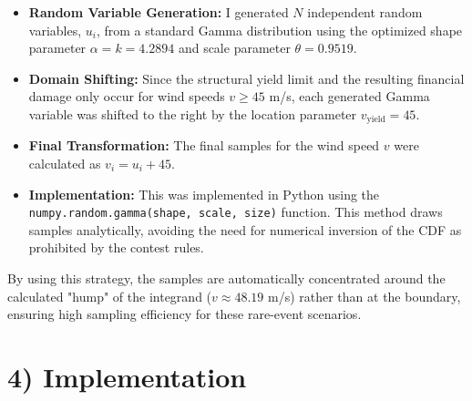\documentclass{article}
\begin{document}
\begin{itemize}
    \item \textbf{Random Variable Generation:} I generated $N$ independent random variables, $u_i$, from a standard Gamma distribution using the optimized shape parameter $\alpha = k = 4.2894$ and scale parameter $\theta = 0.9519$.
    \item \textbf{Domain Shifting:} Since the structural yield limit and the resulting financial damage only occur for wind speeds $v \geq 45$ m/s, each generated Gamma variable was shifted to the right by the location parameter $v_{\text{yield}} = 45$.
    \item \textbf{Final Transformation:} The final samples for the wind speed $v$ were calculated as $v_i = u_i + 45$.
    \item \textbf{Implementation:} This was implemented in Python using the \texttt{numpy.random.gamma(shape, scale, size)} function. This method draws samples analytically, avoiding the need for numerical inversion of the CDF as prohibited by the contest rules.
\end{itemize}

By using this strategy, the samples are automatically concentrated around the calculated "hump" of the integrand ($v \approx 48.19$ m/s) rather than at the boundary, ensuring high sampling efficiency for these rare-event scenarios.



\section*{4) Implementation}
\end{document}
